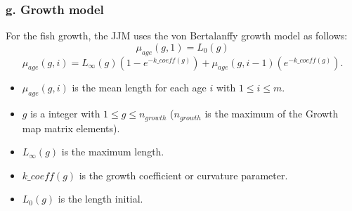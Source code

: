 \documentclass{article}
\begin{document}
\hfill

\subsubsection{g. Growth model} \label{ch: g}

For the fish growth, the JJM uses the von Bertalanffy growth model as follows:
\begin{equation}
    \mu_{age}(g,1)=L_0(g)
\end{equation}
\begin{equation}
    \mu_{age}(g,i)=L_{\infty}(g)(1-e^{-{k\_coeff(g)}})+\mu_{age}(g,i-1)(e^{-k\_{coeff(g)}}).
\end{equation}
 \begin{itemize}
    \item $\mu_{age}(g,i)$ is the mean length for each age $i$ with $1\leq i \leq m$.
     \item $g$ is a integer with 
     $1\leq g \leq n_{growth}$ ($n_{growth}$ is the maximum of the Growth map matrix elements). 
     \item $L_{\infty}(g)$ is the maximum length.
     \item $k\_coeff(g)$ is the growth coefficient or curvature parameter.
     \item $L_0(g)$ is the length initial.
     
 \end{itemize}
     

\hfill
\end{document}
